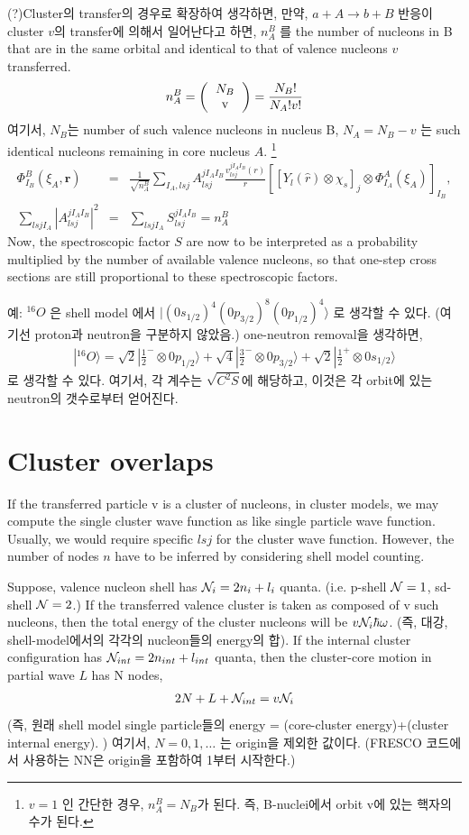 \documentclass[11pt]{book}
\def\bm{\boldsymbol}
\def\vr{{\bm r}}
\def\ra{\rangle}
\newcommand{\bea}{\begin{eqnarray}}
\newcommand{\eea}{\end{eqnarray}}
\newcommand{\no}{\nonumber \\}
\begin{document}
(?)Cluster의 transfer의 경우로 확장하여 생각하면, 
만약, $a+A\to b+B$ 반응이 cluster $v$의 transfer에 의해서 일어난다고 하면, 
$n^B_A$ 를 the number of nucleons in B that are in the same orbital and 
identical to that of valence nucleons $v$ transferred.
\bea 
n^B_A=\left(\begin{tabular}{c} $N_B$ \\ v \end{tabular}\right)
     =\frac{N_B !}{N_A ! v!}
\eea 
여기서, $N_B$는 number of such valence nucleons in nucleus B,
$N_A=N_B-v$ 는 such identical nucleons remaining in core nucleus $A$. \footnote{
$v=1$ 인 간단한 경우, $n_A^B=N_B$가 된다. 즉, B-nuclei에서 orbit v에 있는 핵자의 수가 된다.   
} 
\bea 
\Phi^B_{I_B}(\xi_A,\vr)&=&\frac{1}{\sqrt{n^B_A}} 
    \sum_{I_A,lsj} A^{j I_A I_B}_{lsj} \frac{v^{j I_A I_B}_{lsj}(r)}{r}
    \left[ \left[ Y_{l}(\hat{r})\otimes \chi_s\right]_{j}\otimes \Phi^A_{I_A}(\xi_A) \right]_{I_B},\no 
\sum_{lsjI_A}|A^{j I_A I_B}_{lsj}|^2&=& \sum_{lsjI_A} S^{j I_A I_B}_{lsj}= n_A^B
\eea 
Now, the spectroscopic factor $S$ are now to be interpreted as a
probability multiplied by the number of available valence nucleons, 
so that one-step cross sections are still proportional to these spectroscopic 
factors. 

예: $^{16}O$ 은 shell model 에서 $|(0s_{1/2})^4(0p_{3/2})^8(0p_{1/2})^4\ra$ 로 생각할 수 있다. 
    (여기선 proton과 neutron을 구분하지 않았음.)
    one-neutron removal을 생각하면,
    \bea 
    |^{16}O\ra=\sqrt{2}|\frac{1}{2}^{-}\otimes 0p_{1/2}\ra
              +\sqrt{4}|\frac{3}{2}^-\otimes 0p_{3/2}\ra  
              +\sqrt{2}|\frac{1}{2}^+\otimes 0s_{1/2}\ra  
    \eea 
    로 생각할 수 있다. 여기서, 각 계수는 $\sqrt{C^2S}$에 해당하고, 
    이것은 각 orbit에 있는 neutron의 갯수로부터 얻어진다. 

\section{Cluster overlaps}
If the transferred particle v is a cluster of nucleons,
in cluster models, we may compute the single cluster wave function
as like single particle wave function. Usually, we would require specific 
$lsj$ for the cluster wave function. However, the number of nodes $n$ have to be
inferred by considering shell model counting.

Suppose, valence nucleon shell has ${\cal N}_i=2 n_i+l_i$ quanta. (i.e. p-shell ${\cal N}=1$, sd-shell ${\cal N}=2$.) If the transferred valence cluster is taken
as composed of v such nucleons, then the total energy of the cluster nucleons
 will be $v{\cal N}_i \hbar\omega$. (즉, 대강, shell-model에서의 각각의 nucleon들의
 energy의 합). If the internal cluster configuration has ${\cal N}_{int}=2n_{int}+l_{int}$ quanta, then the cluster-core motion in partial wave $L$
 has N nodes,
 \bea 
 2N+L+{\cal N}_{int}=v {\cal N}_i
 \eea 
(즉, 원래 shell model single particle들의 energy 
= (core-cluster energy)+(cluster internal energy). )
여기서, $N=0,1,\dots$ 는 origin을 제외한 값이다. (FRESCO 코드에서 사용하는 NN은 
origin을 포함하여 1부터 시작한다.)
\end{document}
